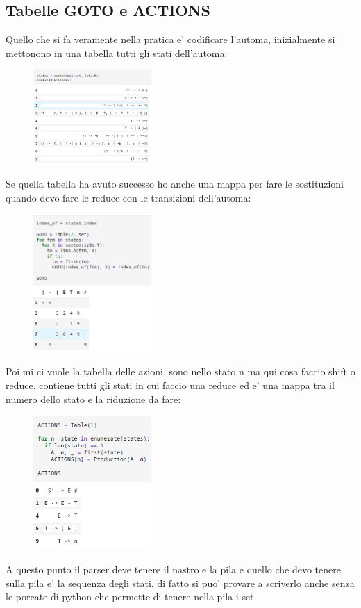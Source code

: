 \subsection{Tabelle GOTO e ACTIONS}
Quello che si fa veramente nella pratica e' codificare l'automa, inizialmente si mettonono in una tabella tutti gli stati dell'automa:

\begin{figure}[ht!]
  \centering
  \includegraphics[width=0.4\textwidth]{images/Parsing/tabella_states.png}
\end{figure}

Se quella tabella ha avuto successo ho anche una mappa per fare le sostituzioni quando devo fare le reduce con le transizioni dell'automa:

\begin{figure}[ht!]
  \centering
  \includegraphics[width=0.4\textwidth]{images/Parsing/tabella_GOTO.png}
\end{figure}

Poi mi ci vuole la tabella delle azioni, sono nello stato n ma qui cosa faccio shift o reduce, contiene tutti gli stati in cui faccio una reduce ed e' una mappa tra il numero dello stato e la riduzione da fare:

\begin{figure}[ht!]
  \centering
  \includegraphics[width=0.4\textwidth]{images/Parsing/tabellaACTIONS.png}
\end{figure}

A questo punto il parser deve tenere il nastro e la pila e quello che devo tenere sulla pila e' la sequenza degli stati, di fatto si puo' provare a scriverlo anche senza le porcate di python che permette di tenere nella pila i set.